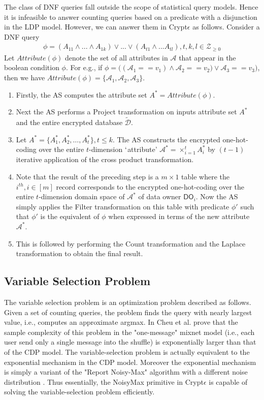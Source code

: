 The class of DNF queries fall outside the scope of statistical query models. Hence it is infeasible to answer counting queries based on a predicate with a disjunction in the LDP model. However, we can answer them in Crypt$\epsilon$ as follows.
Consider a DNF query 
\begin{gather}\phi = (A_{11}\land ...\land A_{1k}) \vee ... \vee (A_{t1}\land ... A_{tl}), t, k,l \in \mathcal{Z}_{\geq 0} \end{gather}
Let $Attribute(\phi)$ denote the set of all attributes in $\mathcal{A}$ that appear in the boolean condition $\phi$. For e.g., if $\phi = \big((\mathcal{A}_1==v_1) \land \mathcal{A}_2==v_2) \vee \mathcal{A}_3==v_3 \big)$, then  we have $Attribute(\phi)=\{\mathcal{A}_1, \mathcal{A}_2,\mathcal{A}_3\}$. \begin{enumerate}\item Firstly, the \textsf{AS} computes the attribute set $A^*=Attribute(\phi)$.
\item Next the \textsf{AS} performs a \textsf{Project} transformation on inputs attribute set $A^*$ and the entire encrypted database $\boldsymbol{\tilde{\mathcal{D}}}$. 
\item Let $A^*= \{A^*_1,A^*_2,\ldots,A^*_t\}, t \leq k$. The \textsf{AS} constructs the encrypted one-hot-coding over the entire $t$-dimension $\lq$attribute' $\mathcal{A}^*=\times_{i=1}^t A^*_i$ by $(t-1)$ iterative application of the cross product transformation. 
\item Note that the result of the preceding step is a $m\times 1$ table where the $i^{th} , i \in [m]$ record corresponds to the encrypted one-hot-coding over the entire $t$-dimension domain space of $\mathcal{A}^*$ of data owner $\textsf{DO}_i$. Now the \textsf{AS} simply applies the \textsf{Filter} transformation on this table with predicate $\phi'$  such that $\phi'$ is the equivalent of $\phi$ when expressed in terms of the new  attribute $\mathcal{A}^*$.
\item This is followed by performing the \textsf{Count} transformation and the \textsf{Laplace} transformation to obtain the final result. 
\end{enumerate}
\subsection*{Variable Selection Problem} The variable selection problem is an optimization problem described as follows. Given a set of counting queries, the problem finds the query with nearly largest value, i.e., computes an approximate argmax. In \cite{mixnets} Cheu et al. prove that the sample complexity of this problem in the "one-message" mixnet model (i.e., each user send only a single message into the shuffle) is exponentially larger than that of the \textsf{CDP} model. The variable-selection problem is actually equivalent to the exponential mechanism\cite{Dork} in the \textsf{CDP} model. Moreover the exponential mechanism is simply a variant of the "Report Noisy-Max" algorithm with a different noise distribution \cite{Nm}. Thus essentially, the \textsf{NoisyMax} primitive in Crypt$\epsilon$ is capable of solving the variable-selection problem efficiently. 
